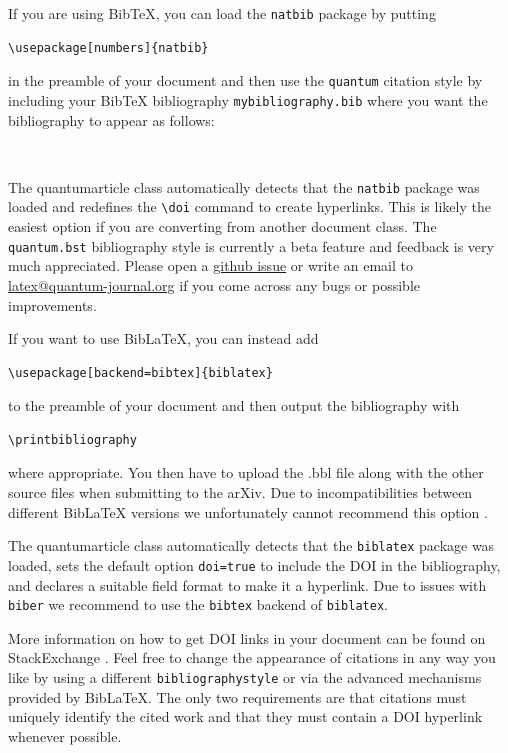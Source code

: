 \documentclass[a4paper,twocolumn,11pt]{quantumarticle}
\begin{document}
If you are using BibTeX, you can load the \texttt{natbib} package by putting
\begin{verbatim}
\usepackage[numbers]{natbib}
\end{verbatim}
in the preamble of your document and then use the \texttt{quantum} citation style by including your BibTeX bibliography \texttt{mybibliography.bib} where you want the bibliography to appear as follows:
\begin{verbatim}


\end{verbatim}
The quantumarticle class automatically detects that the \texttt{natbib} package was loaded and redefines the \texttt{\textbackslash{}doi} command to create hyperlinks.
This is likely the easiest option if you are converting from another document class.
The \texttt{quantum.bst} bibliography style is currently a beta feature and feedback is very much appreciated. Please open a \href{https://github.com/quantum-journal/quantum-journal/issues}{github issue} or write an email to \href{mailto:latex@quantum-journal.org}{latex@quantum-journal.org} if you come across any bugs or possible improvements.

If you want to use BibLaTeX, you can instead add
\begin{verbatim}
\usepackage[backend=bibtex]{biblatex}

\end{verbatim}
to the preamble of your document and then output the bibliography with
\begin{verbatim}
\printbibliography
\end{verbatim}
where appropriate.
You then have to upload the .bbl file along with the other source files when submitting to the arXiv.
Due to incompatibilities between different BibLaTeX versions we unfortunately cannot recommend this option \cite{biblatexsubmittingtothearxiv}.

The quantumarticle class automatically detects that the \texttt{biblatex} package was loaded, sets the default option \texttt{doi=true} to include the DOI in the bibliography, and declares a suitable field format to make it a hyperlink.
Due to issues with \texttt{biber} we recommend to use the \texttt{bibtex} backend of \texttt{biblatex}.

More information on how to get DOI links in your document can be found on StackExchange \cite{howtogetdoilinksinbibliography,automaticallyaddingdoifieldstoahandmadebibliography}.
Feel free to change the appearance of citations in any way you like by using a different \texttt{bibliographystyle} or via the advanced mechanisms provided by BibLaTeX.
The only two requirements are that citations must uniquely identify the cited work and that they must contain a DOI hyperlink whenever possible.
\end{document}
